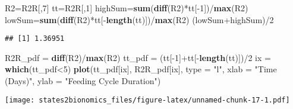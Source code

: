 \documentclass[]{article}
\newenvironment{Shaded}{\begin{snugshade}}{\end{snugshade}}
\newcommand{\KeywordTok}[1]{\textcolor[rgb]{0.13,0.29,0.53}{\textbf{{#1}}}}
\newcommand{\DataTypeTok}[1]{\textcolor[rgb]{0.13,0.29,0.53}{{#1}}}
\newcommand{\DecValTok}[1]{\textcolor[rgb]{0.00,0.00,0.81}{{#1}}}
\newcommand{\StringTok}[1]{\textcolor[rgb]{0.31,0.60,0.02}{{#1}}}
\newcommand{\NormalTok}[1]{{#1}}
\begin{document}
\begin{Shaded}
\begin{Highlighting}[]
\NormalTok{R2=R2R[,}\DecValTok{7}\NormalTok{]}
\NormalTok{tt=R2R[,}\DecValTok{1}\NormalTok{]}
\NormalTok{highSum=}\KeywordTok{sum}\NormalTok{(}\KeywordTok{diff}\NormalTok{(R2)*tt[-}\DecValTok{1}\NormalTok{])/}\KeywordTok{max}\NormalTok{(R2)}
\NormalTok{lowSum=}\KeywordTok{sum}\NormalTok{(}\KeywordTok{diff}\NormalTok{(R2)*tt[-}\KeywordTok{length}\NormalTok{(tt)])/}\KeywordTok{max}\NormalTok{(R2)}
\NormalTok{(lowSum+highSum)/}\DecValTok{2}
\end{Highlighting}
\end{Shaded}

\begin{verbatim}
## [1] 1.36951
\end{verbatim}

\begin{Shaded}
\begin{Highlighting}[]
\NormalTok{R2R_pdf =}\StringTok{ }\KeywordTok{diff}\NormalTok{(R2)/}\KeywordTok{max}\NormalTok{(R2)}
\NormalTok{tt_pdf =}\StringTok{ }\NormalTok{(tt[-}\DecValTok{1}\NormalTok{]+tt[-}\KeywordTok{length}\NormalTok{(tt)])/}\DecValTok{2}
\NormalTok{ix =}\StringTok{ }\KeywordTok{which}\NormalTok{(tt_pdf<}\DecValTok{5}\NormalTok{)}
\KeywordTok{plot}\NormalTok{(tt_pdf[ix], R2R_pdf[ix], }\DataTypeTok{type =} \StringTok{"l"}\NormalTok{, }\DataTypeTok{xlab =} \StringTok{"Time (Days)"}\NormalTok{, }\DataTypeTok{ylab =} \StringTok{"Feeding Cycle Duration"}\NormalTok{)}
\end{Highlighting}
\end{Shaded}

\texttt{[image: states2bionomics\_files/figure-latex/unnamed-chunk-17-1.pdf]}
\end{document}
